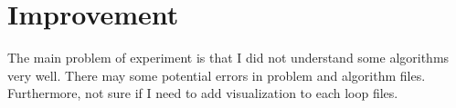 \documentclass{article}
\begin{document}
\section{Improvement}
The main problem of experiment is that I did not understand some algorithms very well. There may some potential 
errors in problem and algorithm files. Furthermore, not sure if I need to add visualization to each loop files.


\begin{center}


\end{center}
\end{document}

